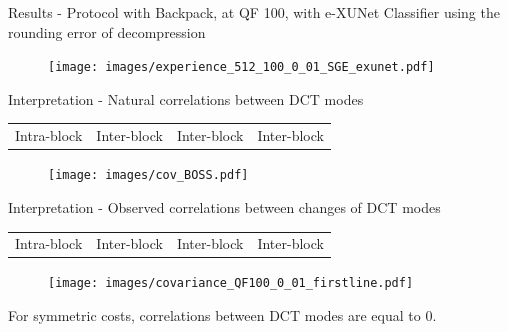 \documentclass[10pt,aspectratio=169]{beamer}
\begin{document}
\begin{frame}{Results - Protocol with Backpack, at QF 100, with e-XUNet}
Classifier using the rounding error of decompression~
    \begin{figure}[h]
        \texttt{[image: images/experience\_512\_100\_0\_01\_SGE\_exunet.pdf]}
    \end{figure}
\end{frame}


\begin{frame}{Interpretation - Natural correlations between DCT modes}
    \begin{tabularx}{0.9\textwidth} { 
        >{\centering\arraybackslash}X 
        >{\centering\arraybackslash}X 
        >{\centering\arraybackslash}X
        >{\centering\arraybackslash}X  }
        Intra-block & Inter-block & Inter-block & Inter-block \\ 
   \end{tabularx}

    \begin{figure}[h]
        \texttt{[image: images/cov\_BOSS.pdf]}
    \end{figure}
\end{frame}


\begin{frame}{Interpretation - Observed correlations between changes of DCT modes}
        

    \begin{tabularx}{0.9\textwidth} { 
         >{\centering\arraybackslash}X 
         >{\centering\arraybackslash}X 
         >{\centering\arraybackslash}X
         >{\centering\arraybackslash}X  }
         Intra-block & Inter-block & Inter-block & Inter-block \\ 
    \end{tabularx}

    \begin{figure}[h]
        \texttt{[image: images/covariance\_QF100\_0\_01\_firstline.pdf]}
    \end{figure}

    \pause

    For symmetric costs, correlations between DCT modes are equal to 0. 
    
\end{frame}
\end{document}
